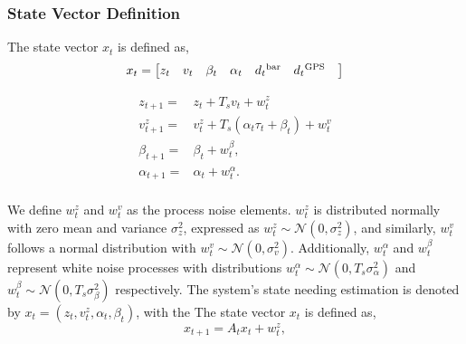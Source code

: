 \documentclass{article}
\begin{document}
    \subsubsection*{State Vector Definition}
    The state vector \( x_t \) is defined as,
    \begin{equation}
        x_t = 
        \begin{bmatrix}
            z_t &
            v_{t} & 
            \beta_t & 
            \alpha_t &
            d{_t}^{\rm bar}&
            d{_t}^{\rm GPS}&
        \end{bmatrix}
        \label{stateVectorXt}
    \end{equation}

    \begin{align}
        z_{t+1} =& z_t + {T_s}{v_t} + w^{z}_{t}\\
        v_{t+1}^z =& v_t^z + T_s (\alpha_t \tau_t + \beta_t) + w_t^v\\
        \beta_{t+1} {}={} & \beta_t + w^\beta_t,\\
        \alpha_{t+1} {}={} & \alpha_t + w^\alpha_t.\\
    \end{align}

    We define $w_t^z$ and $w_t^v$ as the process noise elements.
    $w_t^z$ is distributed normally with zero mean and variance
    $\sigma_z^2$, expressed as $w_t^z \sim \mathcal{N}(0, \sigma_z^2)$, 
    and similarly, $w_t^v$ follows a normal distribution with $w_t^v \sim \mathcal{N}(0, \sigma_v^2)$.
    Additionally, $w_t^\alpha$ and $w_t^\beta$ represent white noise processes with distributions
    $w_t^\alpha \sim \mathcal{N}(0, T_s \sigma_\alpha^2)$ and $w_t^\beta \sim \mathcal{N}(0, T_s \sigma_\beta^2)$ 
    respectively. The system's state needing estimation is denoted by $x_t = (z_t, v_t^z, \alpha_t, \beta_t)$, 
    with the The state vector \( x_t \) is defined as,
    \begin{equation}
        x_{t+1} = A_t x_t + w_t^z,
    \end{equation}
\end{document}
